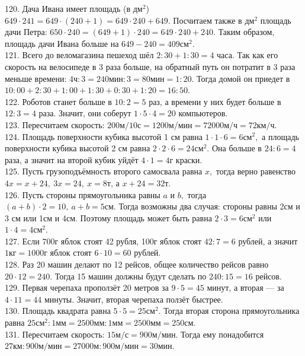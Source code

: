 \documentclass[12pt]{article}
\begin{document}
120. Дача Ивана имеет площадь (в $\text{дм}^2$) $649\cdot241=649\cdot(240+1)=649\cdot240+649.$ Посчитаем также в $\text{дм}^2$ площадь дачи Петра:
$650\cdot240=(649+1)\cdot240=649\cdot240+240.$ Таким образом, площадь дачи Ивана больше на $649-240=409\text{см}^2.$\\
121. Всего до веломагазина пешеход шёл $2:30+1:30=4$ часа. Так как его скорость на велосипеде в 3 раза больше, на обратный путь он потратит в 3 раза меньше времени: $4\text{ч}:3=240\text{мин}:3=80\text{мин}=1:20.$ Тогда домой он приедет в $10:00+2:30+1:00+1:30+0:30+1:20=16:50.$\\
122. Роботов станет больше в $10:2=5$ раз, а времени у них будет больше в $12:3=4$ раза. Значит, они соберут $1\cdot5\cdot4=20$ компьютеров.\\
123. Пересчитаем скорость: $200\text{м}/10\text{с}=1200\text{м}/\text{мин}=72000\text{м}/\text{ч}=72\text{км}/\text{ч}.$\\
124. Площадь поверхности кубика высотой 1 см равна $1\cdot1\cdot6=6\text{см}^2,$ а площадь поверхности кубика высотой 2 см равна $2\cdot2\cdot6=24\text{см}^2.$ Она больше в $24:6=4$ раза, а значит на второй кубик уйдёт $4\cdot1=4$г краски.\\
125. Пусть грузоподъёмность второго самосвала равна $x,$ тогда верно равенство $4x=x+24,\ 3x=24,\ x=8$т, а $x+24=32$т.\\
126. Пусть стороны прямоугольника равны $a$ и $b,$ тогда $(a+b)\cdot2=10,\ a+b=5$см. Тогда возможны два случая: стороны равны 2см и 3 см или 1см и 4см. Поэтому площадь может быть равна $2\cdot3=6\text{см}^2$ или $1\cdot4=4\text{см}^2.$\\
127. Если 700г яблок стоят 42 рубля, 100г яблок стоят $42:7=6$ рублей, а значит $1\text{кг}=1000$г яблок стоят $6\cdot10=60$ рублей.\\
128. Раз 20 машин делают по 12 рейсов, общее количество рейсов равно $20\cdot12=240.$ Тогда 15 машин должны будут сделать по $240:15=16$ рейсов.\\
129. Первая черепаха проползёт 20 метров за $9\cdot5=45$ минут, а вторая --- за $4\cdot11=44$ минуты. Значит, вторая черепаха ползёт быстрее.\\
130. Площадь квадрата равна $5\cdot5=25\text{см}^2.$ Тогда вторая сторона прямоугольника равна $25\text{см}^2:1\text{мм}=2500\text{мм}:1\text{мм}=2500\text{мм}=250\text{см}.$\\
131. Пересчитаем скорость: $15\text{м}/\text{с}=900\text{м}/\text{мин}.$ Тогда ему понадобится $27\text{км}:900\text{м}/\text{мин}=
27000\text{м}:900\text{м}/\text{мин}=30$мин.\\
\end{document}
